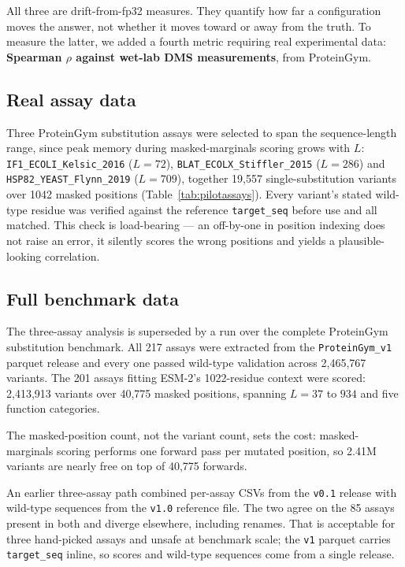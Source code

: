 \documentclass[11pt]{article}
\begin{document}
All three are drift-from-fp32 measures. They quantify how far a configuration
moves the answer, not whether it moves toward or away from the truth. To measure
the latter, we added a fourth metric requiring real experimental data:
\textbf{Spearman $\rho$ against wet-lab DMS measurements}, from ProteinGym.

\subsection{Real assay data}

Three ProteinGym substitution assays were selected to span the sequence-length
range, since peak memory during masked-marginals scoring grows with $L$:
\texttt{IF1\_ECOLI\_Kelsic\_2016} ($L = 72$),
\texttt{BLAT\_ECOLX\_Stiffler\_2015} ($L = 286$) and
\texttt{HSP82\_YEAST\_Flynn\_2019} ($L = 709$), together 19{,}557
single-substitution variants over 1042 masked positions
(Table~\ref{tab:pilotassays}). Every variant's stated wild-type residue was
verified against the reference \texttt{target\_seq} before use and all matched.
This check is load-bearing --- an off-by-one in position indexing does not raise
an error, it silently scores the wrong positions and yields a plausible-looking
correlation.

\subsection{Full benchmark data}

The three-assay analysis is superseded by a run over the complete ProteinGym
substitution benchmark. All 217 assays were extracted from the
\texttt{ProteinGym\_v1} parquet release and every one passed wild-type
validation across 2{,}465{,}767 variants. The 201 assays fitting ESM-2's
1022-residue context were scored: 2{,}413{,}913 variants over 40{,}775 masked
positions, spanning $L = 37$ to $934$ and five function categories.

The masked-position count, not the variant count, sets the cost: masked-marginals
scoring performs one forward pass per mutated position, so 2.41M variants are
nearly free on top of 40{,}775 forwards.

An earlier three-assay path combined per-assay CSVs from the \texttt{v0.1}
release with wild-type sequences from the \texttt{v1.0} reference file. The two
agree on the 85 assays present in both and diverge elsewhere, including renames.
That is acceptable for three hand-picked assays and unsafe at benchmark scale;
the \texttt{v1} parquet carries \texttt{target\_seq} inline, so scores and
wild-type sequences come from a single release.
\end{document}
